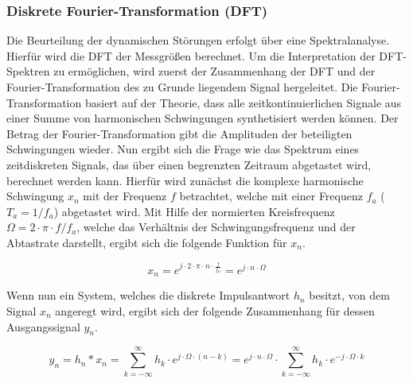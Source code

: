 \subsubsection{Diskrete Fourier-Transformation (DFT)}
Die Beurteilung der dynamischen Störungen erfolgt über eine Spektralanalyse. Hierfür wird die DFT der Messgrößen berechnet. Um die Interpretation der DFT-Spektren zu ermöglichen, wird zuerst der Zusammenhang der DFT und der Fourier-Transformation des zu Grunde liegendem Signal hergeleitet.
Die Fourier-Transformation basiert auf der Theorie, dass alle zeitkontinuierlichen Signale aus einer Summe von harmonischen Schwingungen synthetisiert werden können. Der Betrag der Fourier-Transformation gibt die Amplituden der beteiligten Schwingungen wieder. Nun ergibt sich die Frage wie das Spektrum eines zeitdiskreten Signals, das über einen begrenzten Zeitraum abgetastet wird, berechnet werden kann. Hierfür wird zunächst die komplexe harmonische Schwingung $x_n$ mit der Frequenz $f$ betrachtet, welche mit einer Frequenz $f_a$ ($T_a=1/f_a$) abgetastet wird. Mit Hilfe der normierten Kreisfrequenz $\Omega=2\cdot \pi \cdot f/f_a$, welche das Verhältnis der Schwingungsfrequenz und der Abtastrate darstellt, ergibt sich die folgende Funktion für $x_n$.

\begin{equation}
x_n = e^{j\cdot 2 \cdot \pi \cdot  n \cdot \frac{f}{f_a}} = e^{j\cdot n\cdot \Omega}
\end{equation} 

Wenn nun ein System, welches die diskrete Impulsantwort $h_n$ besitzt, von dem Signal $x_n$ angeregt wird, ergibt sich der folgende Zusammenhang für dessen Ausgangssignal $y_n$.

\begin{equation}
y_n = h_n * x_n = \sum^{\infty}_{k=-\infty}h_k \cdot e^{j\cdot\Omega\cdot(n-k)} = e^{j\cdot n\cdot \Omega} \cdot \sum^{\infty}_{k=-\infty} h_k \cdot e^{-j\cdot \Omega \cdot k}
\end{equation}

